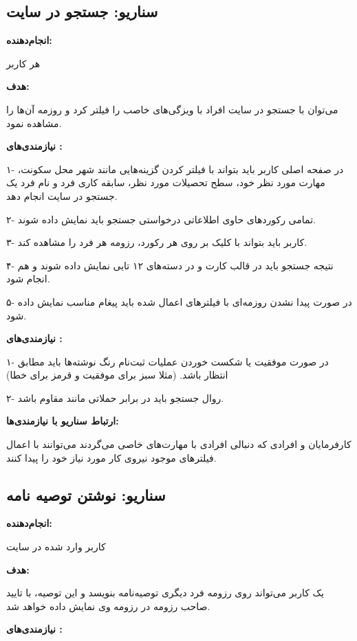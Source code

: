 \documentclass[]{article}
\begin{document}
	\subsection{\LARGE{سناریو: جستجو در سایت}}
	
	\textbf{انجام‌دهنده:}
	
	هر کاربر
	
	\textbf{هدف:}
	
	می‌توان با جستجو در سایت افراد با ویزگی‌های خاصب را فیلتر کرد و روزمه آن‌ها را مشاهده نمود.
	
	\textbf{نیازمندی‌های :} 
	
	۱- در صفحه اصلی کاربر باید بتواند با فیلتر کردن گزینه‌هایی مانند شهر محل سکونت، مهارت مورد نظر خود، سطح تحصیلات مورد نظر، سابقه کاری فرد و نام فرد یک جستجو در سایت انجام دهد.
	
	۲- تمامی رکورد‌های حاوی اطلاعاتی درخواستی جستجو باید نمایش داده شوند.
	
	۳- کاربر باید بتواند با کلیک بر روی هر رکورد،‌ رزومه هر فرد را مشاهده کند.
	
	۴- نتیجه جستجو باید در قالب کارت و در دسته‌های ۱۲ تایی نمایش داده شوند و  هم انجام شود.
	
	۵- در صورت پیدا نشدن روزمه‌ای با فیلترهای اعمال شده باید پیغام مناسب نمایش داده شود.
	
	\textbf{نیازمندی‌های :}
	
	۱- در صورت موفقیت یا شکست خوردن عملیات ثبت‌نام رنگ نوشته‌ها باید مطابق انتظار باشد. (مثلا سبز برای موفقیت و قرمز برای خطا)
	
	۲- روال جستجو باید در برابر حملاتی مانند  مقاوم باشد.
	
	\textbf{ارتباط سناریو با نیازمندی‌ها:}
	
	کارفرمایان و افرادی که دنبالی افرادی با مهارت‌های خاصی می‌گردند می‌توانند با اعمال فیلترهای موجود نیروی کار مورد نیاز خود را پیدا کنند.
	
	
	\subsection{\LARGE{سناریو: نوشتن توصیه نامه}}
	
	\textbf{انجام‌دهنده:}
	
	کاربر وارد شده در سایت
	
	\textbf{هدف:}
	
	یک کاربر می‌تواند روی رزومه فرد دیگری توصیه‌نامه بنویسد و این توصیه‌، با تایید صاحب رزومه در رزومه وی نمایش داده خواهد شد.
	
	\textbf{نیازمندی‌های :} 
	
\end{document}
